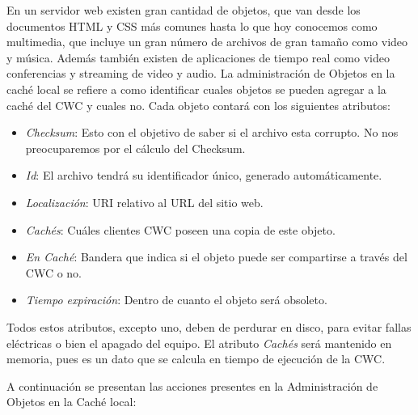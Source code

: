 En un servidor web existen gran cantidad de objetos, que van desde los documentos HTML y CSS más comunes hasta lo que hoy conocemos como multimedia, que incluye un gran número de archivos de gran tamaño como video y música. Además también existen de aplicaciones de tiempo real como video conferencias y streaming de video y audio. La administración de Objetos en la caché local se refiere a como identificar cuales objetos se pueden agregar a la caché del CWC y cuales no. Cada objeto contará con los siguientes atributos:

\begin{itemize}
\item \textit{Checksum}: Esto con el objetivo de saber si el archivo esta corrupto. No nos preocuparemos por el cálculo del Checksum.
\item \textit{Id}: El archivo tendrá su identificador único, generado automáticamente.
\item \textit{Localización}: URI relativo al URL del sitio web.
\item \textit{Cachés}: Cuáles clientes CWC poseen una copia de este objeto. 
\item \textit{En Caché}: Bandera que indica si el objeto puede ser compartirse a través del CWC o no.
\item \textit{Tiempo expiración}: Dentro de cuanto el objeto será obsoleto. 
\end{itemize}

Todos estos atributos, excepto uno, deben de perdurar en disco, para evitar fallas eléctricas o bien el apagado del equipo. El atributo \textit{Cachés} será mantenido en memoria, pues es un dato que se calcula en tiempo de ejecución de la CWC.

A continuación se presentan las acciones presentes en la Administración de Objetos en la Caché local:

